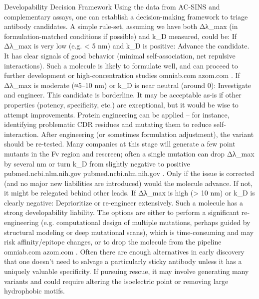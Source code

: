 Developability Decision Framework
Using the data from AC-SINS and complementary assays, one can establish a decision-making framework to triage antibody candidates. A simple rule-set, assuming we have both Δλ_max (in formulation-matched conditions if possible) and k_D measured, could be:
If Δλ_max is very low (e.g. < 5 nm) and k_D is positive: Advance the candidate. It has clear signals of good behavior (minimal self-association, net repulsive interactions). Such a molecule is likely to formulate well, and can proceed to further development or high-concentration studies
omniab.com
azom.com
.
If Δλ_max is moderate (≈5–10 nm) or k_D is near neutral (around 0): Investigate and engineer. This candidate is borderline. It may be acceptable as-is if other properties (potency, specificity, etc.) are exceptional, but it would be wise to attempt improvements. Protein engineering can be applied – for instance, identifying problematic CDR residues and mutating them to reduce self-interaction. After engineering (or sometimes formulation adjustment), the variant should be re-tested. Many companies at this stage will generate a few point mutants in the Fv region and rescreen; often a single mutation can drop Δλ_max by several nm or turn k_D from slightly negative to positive
pubmed.ncbi.nlm.nih.gov
pubmed.ncbi.nlm.nih.gov
. Only if the issue is corrected (and no major new liabilities are introduced) would the molecule advance. If not, it might be relegated behind other leads.
If Δλ_max is high (> 10 nm) or k_D is clearly negative: Deprioritize or re-engineer extensively. Such a molecule has a strong developability liability. The options are either to perform a significant re-engineering (e.g. computational design of multiple mutations, perhaps guided by structural modeling or deep mutational scans), which is time-consuming and may risk affinity/epitope changes, or to drop the molecule from the pipeline
omniab.com
azom.com
. Often there are enough alternatives in early discovery that one doesn’t need to salvage a particularly sticky antibody unless it has a uniquely valuable specificity. If pursuing rescue, it may involve generating many variants and could require altering the isoelectric point or removing large hydrophobic motifs.
